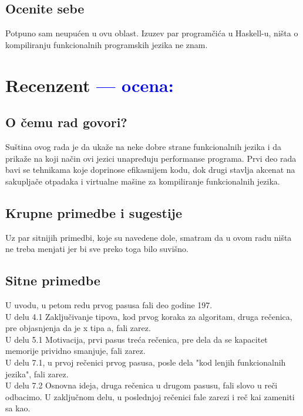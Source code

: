 \documentclass[a4paper]{report}
\newcommand{\odgovor}[1]{\textcolor{blue}{#1}}
\begin{document}
\section{Ocenite sebe}
Potpuno sam neupućen u ovu oblast. Izuzev par programčića u Haskell-u, ništa o kompiliranju funkcionalnih programskih jezika ne znam.

\chapter{Recenzent \odgovor{--- ocena:} }


\section{O čemu rad govori?}
Suština ovog rada je da ukaže na neke dobre strane funkcionalnih jezika i da prikaže na koji način ovi jezici unapređuju performanse programa.
Prvi deo rada bavi se tehnikama koje doprinose efikasnijem kodu, dok drugi stavlja akcenat na sakupljače otpadaka i virtualne mašine za kompiliranje funkcionalnih jezika. 

\section{Krupne primedbe i sugestije}
Uz par sitnijih primedbi, koje su navedene dole, smatram da u ovom radu ništa ne treba menjati jer bi sve preko toga bilo suvišno.


\section{Sitne primedbe}

U uvodu, u petom redu prvog pasusa fali deo godine 197. \\
U delu 4.1 Zaključivanje tipova, kod prvog koraka za algoritam, druga rečenica, pre objasnjenja da je x tipa a, fali zarez. \\
U delu 5.1 Motivacija, prvi pasus treća rečenica, pre dela da se kapacitet memorije prividno smanjuje, fali zarez. \\
U delu 7.1, u prvoj rečenici prvog pasusa, posle dela "kod lenjih funkcionalnih jezika", fali zarez. \\
U delu 7.2 Osnovna ideja, druga rečenica u drugom pasusu, fali slovo u reči odbacimo.
U zaključnom delu, u poslednjoj rečenici fale zarezi i reč kai zameniti sa kao. \\
\end{document}
